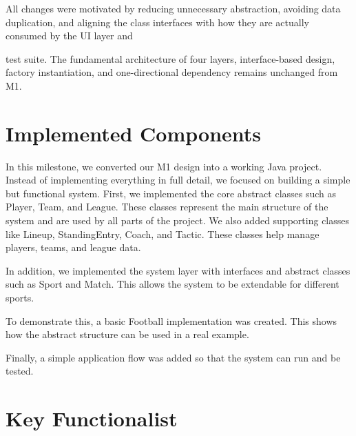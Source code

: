 \documentclass[11pt,a4paper]{article}
\begin{document}
All changes were motivated by reducing unnecessary abstraction, avoiding data duplication, and aligning the class interfaces with how they are actually consumed by the UI layer and

test suite. The fundamental architecture of four layers, interface-based design, factory instantiation, and one-directional dependency remains unchanged from M1.

\section{Implemented Components}

In this milestone, we converted our M1 design into a working Java project. Instead of implementing everything in full detail, we focused on building a simple but functional system. First, we implemented the core abstract classes such as Player, Team, and League. These classes represent the main structure of the system and are used by all parts of the project. We also added supporting classes like Lineup, StandingEntry, Coach, and Tactic. These classes help manage players, teams, and league data.

In addition, we implemented the system layer with interfaces and abstract classes such as Sport and Match. This allows the system to be extendable for different sports.

To demonstrate this, a basic Football implementation was created. This shows how the abstract structure can be used in a real example.

Finally, a simple application flow was added so that the system can run and be tested.

\section{Key Functionalist}
\end{document}
